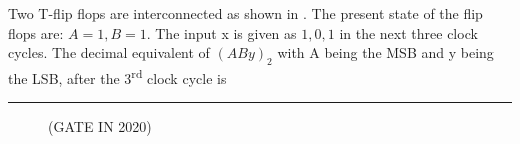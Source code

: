  Two T-flip flops are interconnected as shown in . The present state of the flip flops are: $A = 1, B = 1$. The input x is given as $1, 0, 1$ in the next three clock cycles. The decimal equivalent of $(ABy)_{2}$ with A being the MSB and y being the LSB, after the 3\textsuperscript{rd} clock cycle is \rule{12mm}{0.4pt}

		\vspace{1cm}
	\begin{figure}[H]
		\centering
		
		\caption{}
		\label{fig:tff1}
		\hfill (GATE IN 2020)
	\end{figure}
